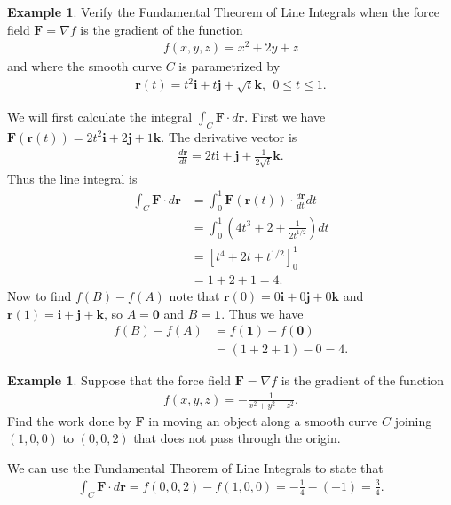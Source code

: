 \documentclass[12pt, letter]{article}
\theoremstyle{plain}
\numberwithin{theorem}{section}
\theoremstyle{definition}
\newtheorem{example}[theorem]{Example}
\begin{document}
\begin{example}
Verify the Fundamental Theorem of Line Integrals when the force field $\bm{F} =\nabla f$ is the gradient of the function
\begin{align*}
f(x,y,z) = x^2+2y+z
\end{align*}
and where the smooth curve $C$ is parametrized by
\begin{align*}
\bm{r}(t)=t^2\bm{i}+t\bm{j}+\sqrt{t}\bm{k}, \ \ 0\leq t\leq 1.
\end{align*}

\bigskip

We will first calculate the integral $\int_C \bm{F}\cdot d\bm{r}$. First we have $\bm{F}(\bm{r}(t)) = 2t^2\bm{i}+2\bm{j}+1\bm{k}$. The derivative vector is
\begin{align*}
\frac{d\bm{r}}{dt} = 2t\bm{i} + \bm{j}+\frac{1}{2\sqrt{t}}\bm{k}.
\end{align*}
Thus the line integral is
\begin{align*}
\int_C \bm{F}\cdot d\bm{r} &= \int_0^1 \bm{F}(\bm{r}(t)) \cdot \frac{d\bm{r}}{dt}dt\\
&= \int_0^1 \left(4t^3+2+\frac{1}{2t^{1/2}}\right)dt\\
&= \left[t^4+2t+t^{1/2}\right]_0^1\\
&=1+2+1=4.
\end{align*}
Now to find $f(B)-f(A)$ note that $\bm{r}(0)=0\bm{i}+0\bm{j}+0\bm{k}$ and $\bm{r}(1)=\bm{i}+\bm{j}+\bm{k}$, so $A=\bm{0}$ and $B=\bm{1}$. Thus we have
\begin{align*}
f(B)-f(A) &= f(\bm{1})-f(\bm{0})\\
&= (1+2+1)-0=4.
\end{align*}
\end{example}

\bigskip

\hrulefill

\bigskip

\begin{example}
Suppose that the force field $\bm{F} = \nabla f$ is the gradient of the function
\begin{align*}
f(x,y,z) = -\frac{1}{x^2+y^2+z^2}.
\end{align*}
Find the work done by $\bm{F}$ in moving an object along a smooth curve $C$ joining $(1,0,0)$ to $(0,0,2)$ that does not pass through the origin.

\bigskip

We can use the Fundamental Theorem of Line Integrals to state that
\begin{align*}
\int_C \bm{F}\cdot d\bm{r} = f(0,0,2)-f(1,0,0) = -\frac{1}{4}-(-1)=\frac{3}{4}.
\end{align*}
\end{example}
\end{document}
